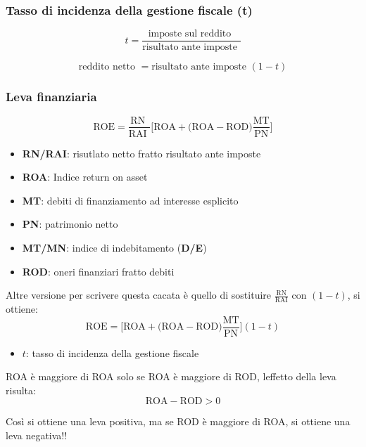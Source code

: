 \subsubsection{Tasso di incidenza della gestione fiscale (t)}
\begin{equation*}
    t = \frac{
        \text{
            imposte sul reddito
        }
    }{
        \text{
            risultato ante imposte
        }
    }
\end{equation*}

\begin{equation*}
    \text{
        reddito netto
    } = \text{
        risultato ante imposte 
    }
    (1 - t)
\end{equation*}

\subsubsection{Leva finanziaria}
\begin{equation*}
    \text{ROE} = \frac{
        \text{
            RN
        }
    }{
        \text{
            RAI
        }
    } \Big[\text{ROA} + \Big(\text{ROA} - \text{ROD}\Big) \frac{\text{MT}}{\text{PN}}\Big]
\end{equation*}

\begin{itemize}
    \item \textbf{RN/RAI}: risutlato netto fratto risultato ante imposte
    \item \textbf{ROA}: Indice return on asset
    \item \textbf{MT}: debiti di finanziamento ad interesse esplicito
    \item \textbf{PN}: patrimonio netto
    \item \textbf{MT/MN}: indice di indebitamento (\textbf{D/E})
    \item \textbf{ROD}: oneri finanziari fratto debiti
\end{itemize}

Altre versione per scrivere questa cacata è quello di sostituire $\frac{\text{RN}}{\text{RAI}}$ con 
$(1 - t)$, si ottiene:
\begin{equation*}
    \text{ROE} = 
    \Big[\text{ROA} + \Big(\text{ROA} - \text{ROD}\Big) \frac{\text{MT}}{\text{PN}}\Big] (1 - t)
\end{equation*}

\begin{itemize}
    \item \textbf{$t$}: tasso di incidenza della gestione fiscale
\end{itemize}

ROA è maggiore di ROA solo se ROA è maggiore di ROD, leffetto della leva risulta:
\begin{equation*}
    \text{ROA} - \text{ROD} > 0
\end{equation*}

Così si ottiene una leva positiva, ma se ROD è maggiore di ROA, si ottiene una leva negativa!!

